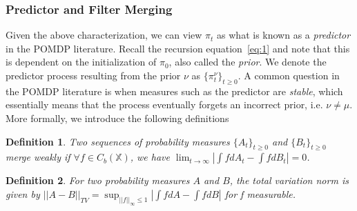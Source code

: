 \documentclass{article}
\newtheorem{definition}{Definition}[section]
\begin{document}
\subsubsection*{Predictor and Filter Merging}




Given the above characterization, we can view \( \pi_t \) as what is known as a \emph{predictor} in the POMDP literature. Recall the recursion equation~\eqref{eq:1} and note that this is dependent on the initialization of \( \pi_0 \), also called the \emph{prior}. We denote the predictor process resulting from the prior \( \nu \) as \( \{\pi_t^\nu \}_{t\ge0} \). A common question in the POMDP literature is when measures such as the predictor are \emph{stable}, which essentially means that the process eventually forgets an incorrect prior, i.e. \( \nu \neq \mu \). More formally, we introduce the following definitions

\begin{definition}\label{definition:weak_merge}
    Two sequences of probability measures \( \{A_t\}_{t\ge0} \) and \( \{B_t\}_{t\ge0} \) merge weakly if \( \forall f \in C_b(\mathbb{X}) \), we have \( \lim_{t \to \infty} |\int fdA_t - \int fdB_t| = 0\).
\end{definition}

\begin{definition}\label{definition:TV_merge}
    For two probability measures \( A \) and \( B \), the total variation norm is given by \( ||A-B||_{TV} = \sup_{||f||_\infty \le 1} |\int fdA - \int fdB| \) for f measurable.
\end{definition}
\end{document}
